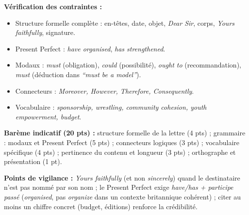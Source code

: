 \documentclass[11pt]{article}
\begin{document}
\begin{corrige}
\textbf{Vérification des contraintes :}
\begin{itemize}
\item Structure formelle complète : en-têtes, date, objet, \emph{Dear Sir}, corps, \emph{Yours faithfully}, signature.
\item Present Perfect : \emph{have organised}, \emph{has strengthened}.
\item Modaux : \emph{must} (obligation), \emph{could} (possibilité), \emph{ought to} (recommandation), \emph{must} (déduction dans \emph{``must be a model''}).
\item Connecteurs : \emph{Moreover, However, Therefore, Consequently}.
\item Vocabulaire : \emph{sponsorship, wrestling, community cohesion, youth empowerment, budget}.
\end{itemize}

\textbf{Barème indicatif (20 pts) :} structure formelle de la lettre (4 pts) ; grammaire : modaux et Present Perfect (5 pts) ; connecteurs logiques (3 pts) ; vocabulaire spécifique (4 pts) ; pertinence du contenu et longueur (3 pts) ; orthographe et présentation (1 pt).

\textbf{Points de vigilance :} \emph{Yours faithfully} (et non \emph{sincerely}) quand le destinataire n'est pas nommé par son nom ; le Present Perfect exige \emph{have/has + participe passé} (\emph{organised}, pas \emph{organize} dans un contexte britannique cohérent) ; citer au moins un chiffre concret (budget, éditions) renforce la crédibilité.
\end{corrige}
\end{document}
